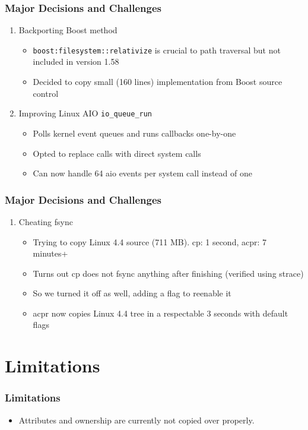 \documentclass{beamer}
\begin{document}
\begin{frame}
    \frametitle{Major Decisions and Challenges}
    \begin{enumerate}[1.]
        \item{Backporting Boost method }
            \begin{itemize}
                \item{\texttt{boost:filesystem::relativize} is crucial to path
                        traversal but not included in version 1.58 }
                \item{Decided to copy small (160 lines) implementation from
                        Boost source control }
            \end{itemize}
        \item{Improving Linux AIO \texttt{io\_queue\_run} }
            \begin{itemize}
                \item{Polls kernel event queues and runs callbacks one-by-one }
                \item{Opted to replace calls with direct system calls }
                \item{Can now handle 64 aio events per system call instead of one }
            \end{itemize}
    \end{enumerate}
\end{frame}

\begin{frame}
\frametitle{Major Decisions and Challenges}
\begin{enumerate}[1.]
	\item{Cheating fsync}
	\begin{itemize}
		\item{Trying to copy Linux 4.4 source (711 MB). cp: 1 second, acpr: 7 minutes+}
		\item{Turns out cp does not fsync anything after finishing (verified using strace)}
		\item{So we turned it off as well, adding a flag to reenable it}
		\item{acpr now copies Linux 4.4 tree in a respectable 3 seconds with default flags}
	\end{itemize}
\end{enumerate}
\end{frame}

\section{Limitations}
\begin{frame}
    \frametitle{Limitations}
    \begin{itemize}
        \item{Attributes and ownership are currently not copied over properly. }
    \end{itemize}
\end{frame}
\end{document}
